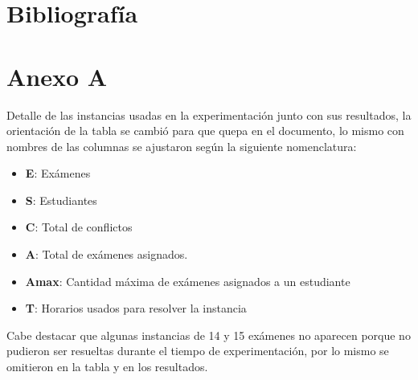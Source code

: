 \documentclass[letter, 10pt]{article}
\begin{document}
\section*{Bibliografía}



\section*{Anexo A}

Detalle de las instancias usadas en la experimentación junto con sus resultados, la orientación de la tabla se cambió para que quepa en el documento, lo mismo con nombres de las columnas se ajustaron según la siguiente nomenclatura:

\begin{itemize}
	\item \textbf{E}: Exámenes
	\item \textbf{S}: Estudiantes
	\item \textbf{C}: Total de conflictos
	\item \textbf{A}: Total de exámenes asignados.
	\item \textbf{Amax}: Cantidad máxima de exámenes asignados a un estudiante
	\item \textbf{T}: Horarios usados para resolver la instancia
\end{itemize}

Cabe destacar que algunas instancias de 14 y 15 exámenes no aparecen porque no pudieron ser resueltas durante el tiempo de experimentación, por lo mismo se omitieron en la tabla y en los resultados.
\end{document}
